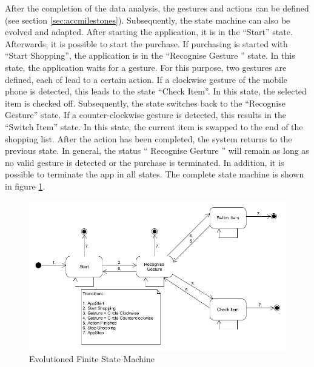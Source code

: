 After the completion of the data analysis, the gestures and actions can be
defined (see section \ref{sec:accmilestones}). Subsequently, the state machine can
also be evolved and adapted. After starting the application, it is in the
``Start'' state. Afterwards, it is possible to start the purchase. If purchasing
is started with ``Start Shopping'', the application is in the ``Recognise
Gesture '' state. In this state, the application waits for a gesture. For this
purpose, two gestures are defined, each of lead to a certain action. If a
clockwise gesture of the mobile phone is detected, this leads to the state
``Check Item''. In this state, the selected item is checked off. Subsequently,
the state switches back to the ``Recognise Gesture'' state. If a
counter-clockwise gesture is detected, this results in the ``Switch Item''
state. In this state, the current item is swapped to the end of the shopping
list. After the action has been completed, the system returns to the previous
state. In general, the status `` Recognise Gesture '' will remain as long as no
valid gesture is detected or the purchase is terminated. In addition, it is
possible to terminate the app in all states. The complete state machine is shown
in figure \ref{fig:evo state machine}.

\begin{figure}[h!]
\centering
\captionsetup{justification=centering}
\includegraphics[width=\textwidth]{res/sa/PresentationStateMachineNew.png}
\caption{Evolutioned Finite State Machine}
\label{fig:evo state machine}
\end{figure}


